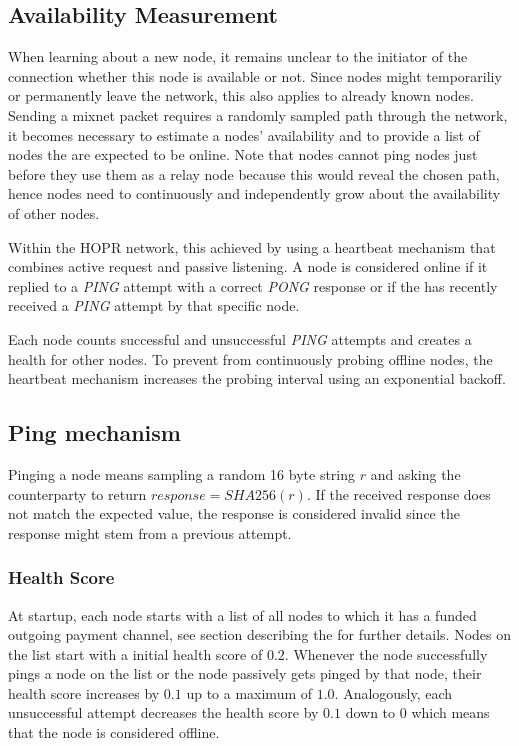 \subsection{Availability Measurement}
\label{sec:p2p:availability}

When learning about a new node, it remains unclear to the initiator of the connection whether this node is available or not. Since nodes might temporariliy or permanently leave the network, this also applies to already known nodes. Sending a mixnet packet requires a randomly sampled path through the network, it becomes necessary to estimate a nodes' availability and to provide a list of nodes the are expected to be online. Note that nodes cannot ping nodes just before they use them as a relay node because this would reveal the chosen path, hence nodes need to continuously and independently grow about the availability of other nodes.

Within the HOPR network, this achieved by using a heartbeat mechanism that combines active request and passive listening. A node is considered online if it replied to a \textit{PING} attempt with a correct \textit{PONG} response or if the has recently received a \textit{PING} attempt by that specific node.

Each node counts successful and unsuccessful \textit{PING} attempts and creates a health for other nodes. To prevent from continuously probing offline nodes, the heartbeat mechanism increases the probing interval using an exponential backoff.

\subsection{Ping mechanism}
\label{sec:p2p:ping-mechanism}

Pinging a node means sampling a random 16 byte string $r$ and asking the counterparty to return $response = SHA256(r)$. If the received response does not match the expected value, the response is considered invalid since the response might stem from a previous attempt.

\subsubsection{Health Score}
\label{sec:p2p:health-score}

At startup, each node starts with a list of all nodes to which it has a funded outgoing payment channel, see section describing the  for further details. Nodes on the list start with a initial health score of $0.2$. Whenever the node successfully pings a node on the list or the node passively gets pinged by that node, their health score increases by $0.1$ up to a maximum of $1.0$. Analogously, each unsuccessful attempt decreases the health score by $0.1$ down to $0$ which means that the node is considered offline.


